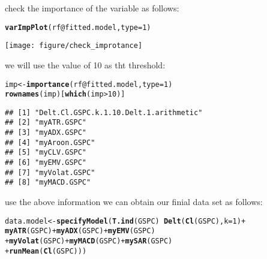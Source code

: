 \documentclass{article}\usepackage[]{graphicx}\usepackage[]{color}
\makeatletter
\def\maxwidth{ %
  \ifdim\Gin@nat@width>\linewidth
    \linewidth
  \else
    \Gin@nat@width
  \fi
}
\newcommand{\hlnum}[1]{\textcolor[rgb]{0.686,0.059,0.569}{#1}}%
\newcommand{\hlopt}[1]{\textcolor[rgb]{0,0,0}{#1}}%
\newcommand{\hlstd}[1]{\textcolor[rgb]{0.345,0.345,0.345}{#1}}%
\newcommand{\hlkwb}[1]{\textcolor[rgb]{0.69,0.353,0.396}{#1}}%
\newcommand{\hlkwc}[1]{\textcolor[rgb]{0.333,0.667,0.333}{#1}}%
\newcommand{\hlkwd}[1]{\textcolor[rgb]{0.737,0.353,0.396}{\textbf{#1}}}%
\newenvironment{kframe}{%
 \def\at@end@of@kframe{}%
 \ifinner\ifhmode%
  \def\at@end@of@kframe{\end{minipage}}%
  \begin{minipage}{\columnwidth}%
 \fi\fi%
 \def\FrameCommand##1{\hskip\@totalleftmargin \hskip-\fboxsep
 \colorbox{shadecolor}{##1}\hskip-\fboxsep
     \hskip-\linewidth \hskip-\@totalleftmargin \hskip\columnwidth}%
 \MakeFramed {\advance\hsize-\width
   \@totalleftmargin\z@ \linewidth\hsize
   \@setminipage}}%
 {\par\unskip\endMakeFramed%
 \at@end@of@kframe}
\newenvironment{knitrout}{}{} %
\makeatother
\begin{document}
check the importance of the variable as follows:
\begin{knitrout}
\color{fgcolor}\begin{kframe}
\begin{alltt}
\hlkwd{varImpPlot}\hlstd{(rf}\hlopt{@}\hlkwc{fitted.model}\hlstd{,} \hlkwc{type} \hlstd{=} \hlnum{1}\hlstd{)}
\end{alltt}
\end{kframe}
\texttt{[image: figure/check\_improtance]} 

\end{knitrout}
we will use the value of 10 as tht threshold:
\begin{knitrout}
\color{fgcolor}\begin{kframe}
\begin{alltt}
\hlstd{imp} \hlkwb{<-} \hlkwd{importance}\hlstd{(rf}\hlopt{@}\hlkwc{fitted.model}\hlstd{,} \hlkwc{type} \hlstd{=} \hlnum{1}\hlstd{)}
\hlkwd{rownames}\hlstd{(imp)[}\hlkwd{which}\hlstd{(imp} \hlopt{>} \hlnum{10}\hlstd{)]}
\end{alltt}
\begin{verbatim}
## [1] "Delt.Cl.GSPC.k.1.10.Delt.1.arithmetic"
## [2] "myATR.GSPC"                           
## [3] "myADX.GSPC"                           
## [4] "myAroon.GSPC"                         
## [5] "myCLV.GSPC"                           
## [6] "myEMV.GSPC"                           
## [7] "myVolat.GSPC"                         
## [8] "myMACD.GSPC"
\end{verbatim}
\end{kframe}
\end{knitrout}
use the above information we can obtain our finial data set as follows:
\begin{knitrout}
\color{fgcolor}\begin{kframe}
\begin{alltt}
\hlstd{data.model} \hlkwb{<-} \hlkwd{specifyModel}\hlstd{(}\hlkwd{T.ind}\hlstd{(GSPC)} \hlopt{~} \hlkwd{Delt}\hlstd{(}\hlkwd{Cl}\hlstd{(GSPC),} \hlkwc{k} \hlstd{=} \hlnum{1}\hlstd{)} \hlopt{+}
                             \hlkwd{myATR}\hlstd{(GSPC)} \hlopt{+} \hlkwd{myADX}\hlstd{(GSPC)} \hlopt{+} \hlkwd{myEMV}\hlstd{(GSPC)}
                           \hlopt{+} \hlkwd{myVolat}\hlstd{(GSPC)} \hlopt{+} \hlkwd{myMACD}\hlstd{(GSPC)} \hlopt{+} \hlkwd{mySAR}\hlstd{(GSPC)}
                           \hlopt{+} \hlkwd{runMean}\hlstd{(}\hlkwd{Cl}\hlstd{(GSPC)))}
\end{alltt}


{\ttfamily\noindent\color{warningcolor}{\#\# Warning: NaNs produced}}\end{kframe}
\end{knitrout}
\end{document}
